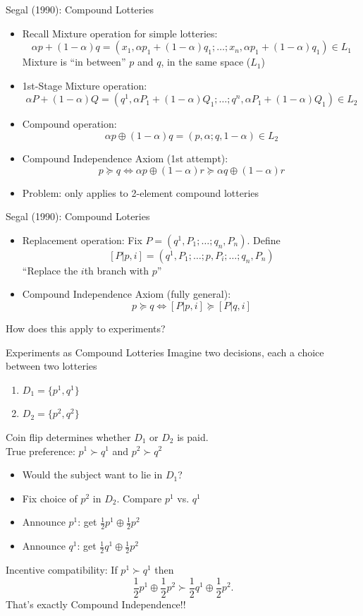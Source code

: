 \begin{frame}{Segal (1990): Compound Lotteries}
\begin{itemize}
    \item Recall Mixture operation for simple lotteries:
    $$
        \alpha p + (1-\alpha) q = (x_1,\alpha p_1 + (1-\alpha) q_1;\ldots;x_n,\alpha p_1 + (1-\alpha)q_1) \in L_1 
    $$
    Mixture is ``in between'' $p$ and $q$, in the same space ($L_1$)
    \item 1st-Stage Mixture operation: 
    $$
        \alpha P + (1-\alpha) Q = (q^1,\alpha P_1 + (1-\alpha) Q_1;\ldots;q^n,\alpha P_1 + (1-\alpha)Q_1) \in L_2
    $$
    \item Compound operation:
    $$
        \alpha p \oplus (1-\alpha) q = (p,\alpha;q,1-\alpha)\in L_2
    $$
    \item Compound Independence Axiom (1st attempt):
    $$
        p \succeq q \iff \alpha p\oplus (1-\alpha) r \succeq \alpha q\oplus (1-\alpha) r
    $$
    \item Problem: only applies to 2-element compound lotteries
\end{itemize}
\end{frame}

\begin{frame}{Segal (1990): Compound Loteries}
\begin{itemize}
    \item Replacement operation: Fix $P=(q^1,P_1;\ldots;q_n,P_n)$. Define 
    $$
    [P|p,i] = (q^1,P_1;\ldots;p,P_i;\ldots;q_n,P_n)
    $$
    ``Replace the $i$th branch with $p$''
    \item Compound Independence Axiom (fully general):
    $$
        p\succeq q \iff [P|p,i] \succeq [P|q,i]
    $$ 
\end{itemize}
\br
How does this apply to experiments?
\end{frame}

\begin{frame}{Experiments as Compound Lotteries}
Imagine two decisions, each a choice between two lotteries
\begin{enumerate}
    \item $D_1=\{p^1,q^1\}$
    \item $D_2=\{p^2,q^2\}$
\end{enumerate}
Coin flip determines whether $D_1$ or $D_2$ is paid.\\
True preference: $p^1\succ q^1$ and $p^2\succ q^2$
\begin{itemize}
    \item Would the subject want to lie in $D_1$?
    \item Fix choice of $p^2$ in $D_2$. Compare $p^1$ vs. $q^1$
    \item Announce $p^1$: get $\frac{1}{2}p^1 \oplus \frac{1}{2}p^2$
    \item Announce $q^1$: get $\frac{1}{2}q^1 \oplus \frac{1}{2}p^2$
\end{itemize}
Incentive compatibility: If $p^1\succ q^1$ then
$$
    \frac{1}{2}p^1 \oplus \frac{1}{2}p^2 \succ \frac{1}{2}q^1 \oplus \frac{1}{2}p^2.
$$
\br
That's exactly Compound Independence!!    
\end{frame}

